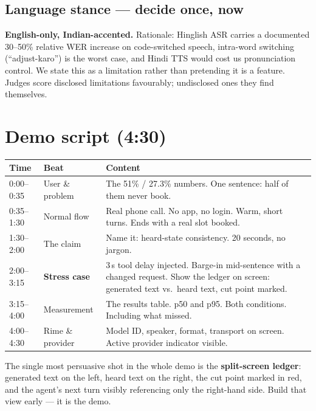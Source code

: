 \documentclass[11pt,a4paper]{article}
\begin{document}
\subsection{Language stance --- decide once, now}

\textbf{English-only, Indian-accented.} Rationale: Hinglish ASR carries a documented
30--50\% relative WER increase on code-switched speech, intra-word switching
(``adjust-karo'') is the worst case, and Hindi TTS would cost us pronunciation control.
We state this as a limitation rather than pretending it is a feature. Judges score
disclosed limitations favourably; undisclosed ones they find themselves.

\section{Demo script (4:30)}

\begin{center}
\begin{tabular}{@{}llp{8.4cm}@{}}
\toprule
\textbf{Time} & \textbf{Beat} & \textbf{Content} \\
\midrule
0:00--0:35 & User \& problem & The 51\% / 27.3\% numbers. One sentence: half of them never book. \\
0:35--1:30 & Normal flow & Real phone call. No app, no login. Warm, short turns. Ends with a real slot booked. \\
1:30--2:00 & The claim & Name it: heard-state consistency. 20 seconds, no jargon. \\
2:00--3:15 & \textbf{Stress case} & 3\,s tool delay injected. Barge-in mid-sentence with a changed request. Show the ledger on screen: generated text vs.\ heard text, cut point marked. \\
3:15--4:00 & Measurement & The results table. p50 and p95. Both conditions. Including what missed. \\
4:00--4:30 & Rime \& provider & Model ID, speaker, format, transport on screen. Active provider indicator visible. \\
\bottomrule
\end{tabular}
\end{center}

\vspace{0.3em}
The single most persuasive shot in the whole demo is the \textbf{split-screen ledger}:
generated text on the left, heard text on the right, the cut point marked in red, and the
agent's next turn visibly referencing only the right-hand side. Build that view early ---
it is the demo.
\end{document}

